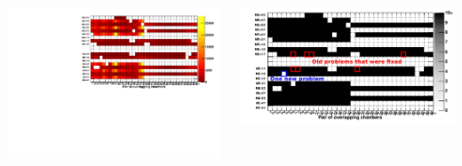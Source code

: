 \documentclass[compress]{beamer}
\begin{document}
\begin{frame}
\begin{columns}
\includegraphics[width=\linewidth]{occupancy_Oct2010.pdf}

\includegraphics[width=\linewidth]{occupancy_problems_Oct2010.pdf}

\end{columns}
\end{frame}
\end{document}
